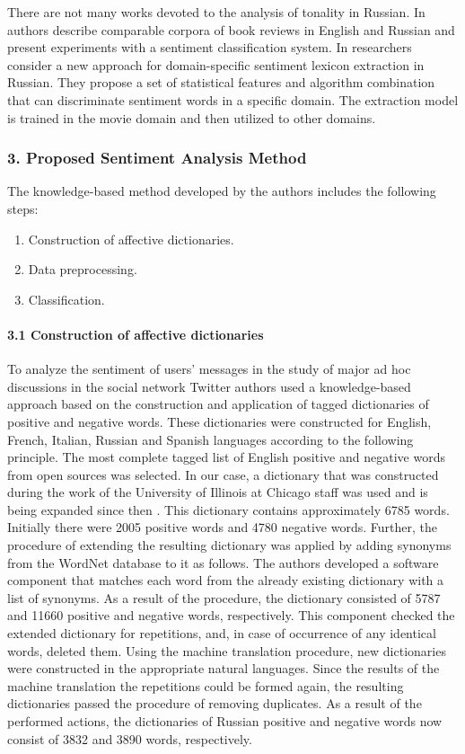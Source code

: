 There are not many works devoted to the analysis of tonality in Russian. In \cite{BelyatskayaZagibalovCaroll} authors describe comparable corpora of book reviews in English and Russian and present experiments with a sentiment classification system. In \cite{ChetviorkinLoukachevitch} researchers consider a new approach for domain-specific sentiment lexicon extraction in Russian. They propose a set of statistical features and algorithm combination that can discriminate sentiment words in a specific domain. The extraction model is trained in the movie domain and then utilized to other domains.

\subsubsection{3. Proposed Sentiment Analysis Method}

The knowledge-based method developed by the authors includes the following steps:
\begin{enumerate}
	\item Construction of affective dictionaries.
	\item Data preprocessing.
	\item Classification.
\end{enumerate}

\paragraph{3.1 Construction of affective dictionaries} 
To analyze the sentiment of users’ messages in the study of major ad hoc discussions in the social network Twitter authors used a knowledge-based approach based on the construction and application of tagged dictionaries of positive and negative words. These dictionaries were constructed for English, French, Italian, Russian and Spanish languages according to the following principle. The most complete tagged list of English positive and negative words from open sources was selected. In our case, a dictionary that was constructed during the work of the University of Illinois at Chicago staff was used and is being expanded since then \cite{EnglishOpinionWords}. This dictionary contains approximately 6785 words. Initially there were 2005 positive words and 4780 negative words. Further, the procedure of extending the resulting dictionary was applied by adding synonyms from the WordNet database to it as follows. The authors developed a software component that matches each word from the already existing dictionary with a list of synonyms. As a result of the procedure, the dictionary consisted of 5787 and 11660 positive and negative words, respectively. This component checked the extended dictionary for repetitions, and, in case of occurrence of any identical words, deleted them. Using the machine translation procedure, new dictionaries were constructed in the appropriate natural languages. Since the results of the machine translation the repetitions could be formed again, the resulting dictionaries passed the procedure of removing duplicates. As a result of the performed actions, the dictionaries of Russian positive and negative words now consist of 3832 and 3890 words, respectively.

